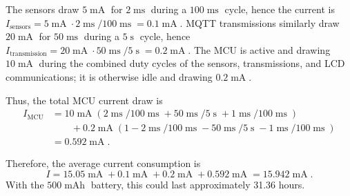 \documentclass{article}
\numberwithin{equation}{section}
\numberwithin{table}{section}
\numberwithin{figure}{section}
\DeclareMathOperator\mah{mAh}
\DeclareMathOperator\mla{mA}
\DeclareMathOperator\mls{ms}
\DeclareMathOperator\second{s}
\begin{document}
\begin{enumerate}
\begin{enumerate}
        The sensors draw $5\mla$ for $2\mls$ during a $100\mls$ cycle, hence the
        current is $ I_\text{sensors} = 5\mla \cdot 2\mls / 100\mls = 0.1\mla $.
        MQTT transmissions similarly draw $20\mla$ for $50\mls$ during a
        $5\second$ cycle, hence $ I_\text{transmission} = 20\mla \cdot
        50\mls/5\second = 0.2\mla $. The MCU is active and drawing $10\mla$
        during the combined duty cycles of the sensors, transmissions, and LCD
        communications; it is otherwise idle and drawing $0.2\mla$.
        
        Thus, the total MCU current draw is
        \begin{align}
            I_\text{MCU} &= 10\mla (2\mls / 100\mls + 50\mls/5\second +
                1\mls/100\mls) \\
            &\qquad+ 0.2\mla(1 - 2\mls/100\mls - 50\mls/5\second -
                1\mls/100\mls) \\
            &= 0.592\mla.
        \end{align}

        Therefore, the average current consumption is
        \begin{equation}
            I = 15.05\mla + 0.1\mla + 0.2\mla + 0.592\mla = 15.942\mla.
        \end{equation}
        With the $500\mah$ battery, this could last approximately 31.36 hours.


\end{enumerate}
\end{enumerate}
\end{document}
